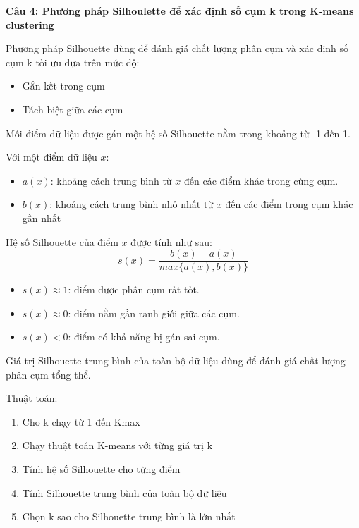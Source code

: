 \textbf{Câu 4: Phương pháp Silhoulette để xác định số cụm k trong K-means clustering}

Phương pháp Silhouette dùng để đánh giá chất lượng phân cụm và xác định số cụm k tối ưu dựa trên mức độ:

\begin{itemize}
	\item Gắn kết trong cụm
	
	\item Tách biệt giữa các cụm
\end{itemize}

Mỗi điểm dữ liệu được gán một hệ số Silhouette nằm trong khoảng từ -1 đến 1.

Với một điểm dữ liệu $x$:

\begin{itemize}
	\item $a(x)$: khoảng cách trung bình từ $x$ đến các điểm khác trong cùng cụm.
	
	\item $b(x)$: khoảng cách trung bình nhỏ nhất từ $x$ đến các điểm trong cụm khác gần nhất
\end{itemize}

Hệ số Silhouette của điểm $x$ được tính như sau:
\[s(x) = \frac{b(x) - a(x)}{max\{a(x), b(x)\}}\]
\begin{itemize}
	\item $s(x) \approx 1$: điểm được phân cụm rất tốt.
	
	\item $s(x) \approx 0$: điểm nằm gần ranh giới giữa các cụm.
	
	\item $s(x) < 0$: điểm có khả năng bị gán sai cụm.
\end{itemize}

Giá trị Silhouette trung bình của toàn bộ dữ liệu dùng để đánh giá chất lượng phân cụm tổng thể.

Thuật toán:
\begin{enumerate}
	\item Cho k chạy từ 1 đến Kmax
	
	\item Chạy thuật toán K-means với từng giá trị k
	
	\item Tính hệ số Silhouette cho từng điểm
	
	\item Tính Silhouette trung bình của toàn bộ dữ liệu
	
	\item Chọn k sao cho Silhouette trung bình là lớn nhất
\end{enumerate}

